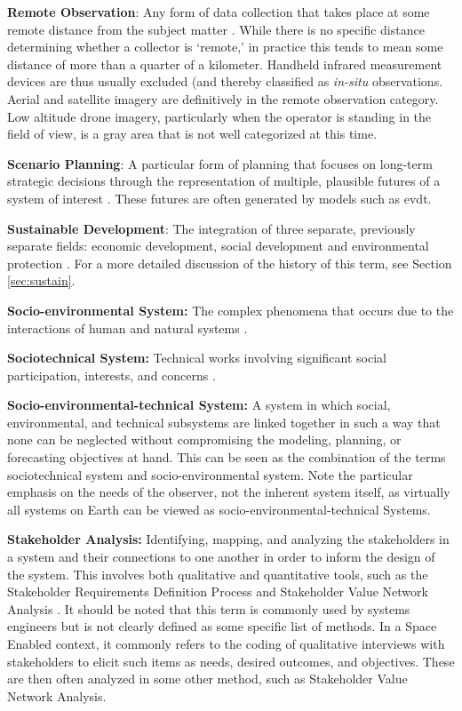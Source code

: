 \textbf{Remote Observation}: Any form of data collection that takes place at some remote distance from the subject matter \cite{jensenRemoteSensingEnvironment2006}. While there is no specific distance determining whether a collector is `remote,' in practice this tends to mean some distance of more than a quarter of a kilometer. Handheld infrared measurement devices are thus usually excluded (and thereby classified as \textit{in-situ} observations. Aerial and satellite imagery are definitively in the remote observation category. Low altitude drone imagery, particularly when the operator is standing in the field of view, is a gray area that is not well categorized at this time.

\textbf{Scenario Planning}: A particular form of planning that focuses on long-term strategic decisions through the representation of multiple, plausible futures of a system of interest \cite{goodspeedScenarioPlanningCities2020}. These futures are often generated by models such as \ac{evdt}.

\textbf{Sustainable Development}: The integration of three separate, previously separate fields: economic development, social development and environmental protection \cite{worldsummitonsustainabledevelopmentPlanImplementationWorld2002}.  For a more detailed discussion of the history of this term, see Section \ref{sec:sustain}.

\textbf{Socio-environmental System:} The complex phenomena that occurs due to the interactions of human and natural systems \cite{elsawahEightGrandChallenges2020}.

\textbf{Sociotechnical System:} Technical works involving significant social participation, interests, and concerns \cite{maierArtSystemsArchitecting2009}.

\textbf{Socio-environmental-technical System:} A system in which social, environmental, and technical subsystems are linked together in such a way that none can be neglected without compromising the modeling, planning, or forecasting objectives at hand. This can be seen as the combination of the terms sociotechnical system and socio-environmental system. Note the particular emphasis on the needs of the observer, not the inherent system itself, as virtually all systems on Earth can be viewed as socio-environmental-technical Systems.

\textbf{Stakeholder Analysis:} Identifying, mapping, and analyzing the stakeholders in a system and their connections to one another in order to inform the design of the system. This involves both qualitative and quantitative tools, such as the Stakeholder Requirements Definition Process \cite{incoseINCOSESystemsEngineering2015} and Stakeholder Value Network Analysis \cite{fengDependencyStructureMatrix2010a}. It should be noted that this term is commonly used by systems engineers but is not clearly defined as some specific list of methods. In a Space Enabled context, it commonly refers to the coding of qualitative interviews with stakeholders to elicit such items as needs, desired outcomes, and objectives. These are then often analyzed in some other method, such as Stakeholder Value Network Analysis.

